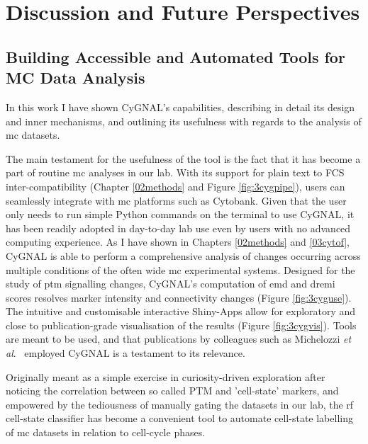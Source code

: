 \chapter{Discussion and Future Perspectives}
\label{07disc}

\section{Building Accessible and Automated Tools for MC Data Analysis}

In this work I have shown CyGNAL's capabilities, describing in detail its design and inner mechanisms, and outlining its usefulness with regards to the analysis of \acrshort{mc} datasets.

The main testament for the usefulness of the tool is the fact that it has become a part of routine \acrshort{mc} analyses in our lab. With its support for plain text to FCS inter-compatibility (Chapter \ref{02methods} and Figure \ref{fig:3cygpipe}), users can seamlessly integrate with \acrshort{mc} platforms such as Cytobank. Given that the user only needs to run simple Python commands on the terminal to use CyGNAL, it has been readily adopted in day-to-day lab use even by users with no advanced computing experience. 
As I have shown in Chapters \ref{02methods} and \ref{03cytof}, CyGNAL is able to perform a comprehensive analysis of changes occurring across multiple conditions of the often wide \acrshort{mc} experimental systems. Designed for the study of \acrshort{ptm} signalling changes, CyGNAL's computation of \acrshort{emd} and \acrshort{dremi} scores resolves marker intensity and connectivity changes (Figure \ref{fig:3cyguse}). The intuitive and customisable interactive Shiny-Apps allow for exploratory and close to publication-grade visualisation of the results (Figure \ref{fig:3cygvis}). Tools are meant to be used, and that publications by colleagues such as Michelozzi \emph{et al}.~\cite{michelozzi_activation_2023} employed CyGNAL is a testament to its relevance.

Originally meant as a simple exercise in curiosity-driven exploration after noticing the correlation between so called PTM and 'cell-state' markers, and empowered by the tediousness of manually gating the datasets in our lab, the \acrshort{rf} cell-state classifier has become a convenient tool to automate cell-state labelling of \acrshort{mc} datasets in relation to cell-cycle phases.

